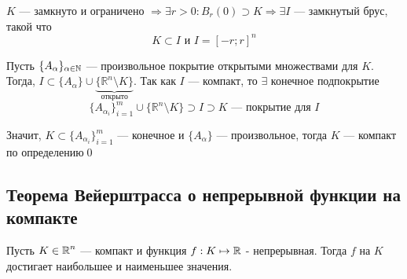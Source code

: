 \documentclass[a4paper]{article}
\begin{document}
$K$ — замкнуто и ограничено $\Longrightarrow \exists r>0:B_r(0)\supset K\Longrightarrow\exists I$ — замкнутый брус, такой что
$$K\subset I\text{ и }I=[-r;r]^n$$

Пусть $\{A_{\alpha}\}_{\alpha\in\operatorname{\mathbb{N}}}$ — произвольное покрытие открытыми множествами для $K$. Тогда, $I\subset \{A_{\alpha}\}\cup\underbrace{\{\mathbb{R}^n\setminus K\}}_{\text{открыто}}$. Так как $I$ — компакт, то $\exists $ конечное подпокрытие
$$\{A_{\alpha_i}\}_{i=1}^m\cup\{\mathbb{R}^n\setminus K\}\supset I\supset K\text{ — покрытие для $I$}$$

Значит, $K\subset\{A_{\alpha_i}\}_{i=1}^{m}$ — конечное и $\{A_{\alpha}\}$ — произвольное, тогда $K$ — компакт по определению\qed

\begin{center}
    
\end{center}


\subsection{Теорема Вейерштрасса о непрерывной функции на компакте}
\theorem Пусть $K\in \operatorname{\mathbb{R}}^n$ — компакт и функция $f: K\mapsto \operatorname{\mathbb{R}}$ - непрерывная. Тогда $f$ на $K$ достигает наибольшее и наименьшее значения.
\end{document}
